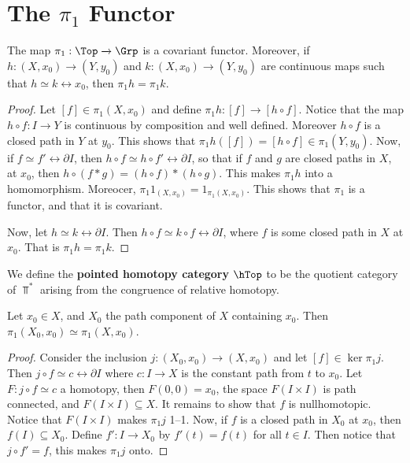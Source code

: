 \section{The $\pi_1$ Functor}

\begin{theorem}\label{4.2.1}
    The map $\pi_1:\Top \xrightarrow{} \Grp$ is a covariant functor. Moreover,
    if $h:(X,x_0) \xrightarrow{} (Y,y_0)$ and $k:(X,x_0) \xrightarrow{} (Y,y_0)$
    are continuous maps such that $h \simeq k \rel{x_0}$, then
    $\pi_1{h}=\pi_1{k}$.
\end{theorem}
\begin{proof}
    Let $[f] \in \pi_1(X,x_0)$ and define $\pi_1{h}:[f] \xrightarrow{} [h \circ
    f]$. Notice that the map $h \circ f:I \xrightarrow{} Y$ is continuous by
    composition and well defined. Moreover $h \circ f$ is a closed path in $Y$
    at $y_0$. This shows that $\pi_1{h}([f])=[h \circ f] \in \pi_1(Y,y_0)$. Now,
    if $f \simeq f' \rel{\partial{I}}$, then $h \circ f \simeq h \circ f'
    \rel{\partial{I}}$, so that if $f$ and  $g$ are closed paths in  $X$, at
    $x_0$, then $h\circ (f \ast g)=(h \circ f) \ast (h \circ g)$. This makes
    $\pi_1{h}$ into a homomorphism. Moreocer,
    $\pi_1{1_{(X,x_0)}}=1_{\pi_1(X,x_0)}$. This shows that $\pi_1$ is a functor,
    and that it is covariant.

    Now, let $h \simeq k \rel{\partial{I}}$. Then $h \circ f \simeq k \circ f
    \rel{\partial{I}}$, where $f$ is some closed path in $X$ at $x_0$. That is
    $\pi_1{h}=\pi_1{k}$.
\end{proof}

\begin{definition}
    We define the \textbf{pointed homotopy category} $\hTop$ to be the quotient
    category of $\Top^*$ arising from the congruence of relative homotopy.
\end{definition}

\begin{theorem}\label{4.2.2}
    Let $x_0 \in X$, and $X_0$ the path component of $X$ containing  $x_0$. Then
    $\pi_1(X_0,x_0) \simeq \pi_1(X,x_0)$.
\end{theorem}
\begin{proof}
    Consider the inclusion $j:(X_0,x_0) \xrightarrow{} (X,x_0)$ and let $[f] \in
    \ker{\pi_1{j}}$. Then $j \circ f \simeq c \rel{\partial{I}}$ where $c:I
    \xrightarrow{} X$ is the constant path from $t$ to  $x_0$. Let $F:j \circ f
    \simeq c$ a homotopy, then  $F(0,0)=x_0$, the space $F(I \times I)$ is path
    connected, and $F(I \times I) \subseteq X$. It remains to show that $f$ is
    nullhomotopic. Notice that  $F(I \times I)$ makes $\pi_1{j}$ 1--1. Now, if
    $f$ is a closed path in $X_0$ at $x_0$, then $f(I) \subseteq X_0$. Define
    $f':I \xrightarrow{} X_0$ by $f'(t)=f(t)$ for all $t \in I$. Then notice
    that  $j \circ f'=f$, this makes  $\pi_1{j}$ onto.
\end{proof}

